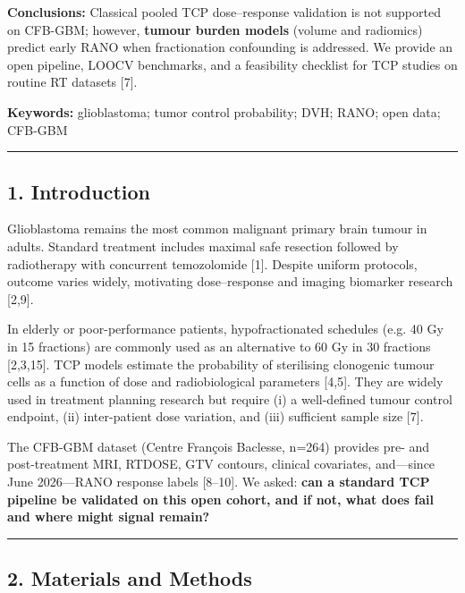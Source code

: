 \documentclass[
  11pt,
]{article}
\begin{document}
\textbf{Conclusions:} Classical pooled TCP dose--response validation is
not supported on CFB-GBM; however, \textbf{tumour burden models} (volume
and radiomics) predict early RANO when fractionation confounding is
addressed. We provide an open pipeline, LOOCV benchmarks, and a
feasibility checklist for TCP studies on routine RT datasets {[}7{]}.

\textbf{Keywords:} glioblastoma; tumor control probability; DVH; RANO;
open data; CFB-GBM

\begin{center}\rule{0.5\linewidth}{0.5pt}\end{center}

\subsection{1. Introduction}\label{introduction}

Glioblastoma remains the most common malignant primary brain tumour in
adults. Standard treatment includes maximal safe resection followed by
radiotherapy with concurrent temozolomide {[}1{]}. Despite uniform
protocols, outcome varies widely, motivating dose--response and imaging
biomarker research {[}2,9{]}.

In elderly or poor-performance patients, hypofractionated schedules
(e.g. 40 Gy in 15 fractions) are commonly used as an alternative to 60
Gy in 30 fractions {[}2,3,15{]}. TCP models estimate the probability of
sterilising clonogenic tumour cells as a function of dose and
radiobiological parameters {[}4,5{]}. They are widely used in treatment
planning research but require (i) a well-defined tumour control
endpoint, (ii) inter-patient dose variation, and (iii) sufficient sample
size {[}7{]}.

The CFB-GBM dataset (Centre François Baclesse, n=264) provides pre- and
post-treatment MRI, RTDOSE, GTV contours, clinical covariates,
and---since June 2026---RANO response labels {[}8--10{]}. We asked:
\textbf{can a standard TCP pipeline be validated on this open cohort,
and if not, what does fail and where might signal remain?}

\begin{center}\rule{0.5\linewidth}{0.5pt}\end{center}

\subsection{2. Materials and Methods}\label{materials-and-methods}
\end{document}

